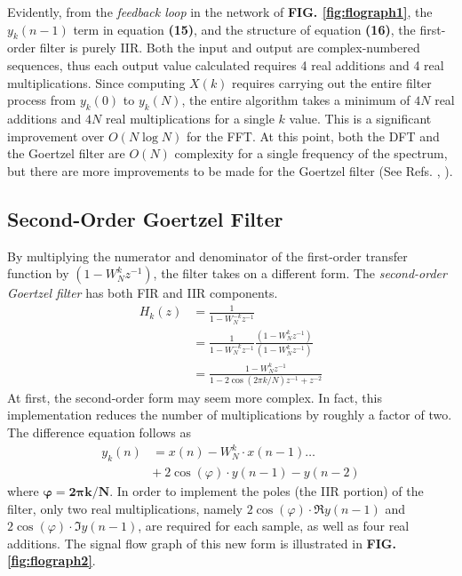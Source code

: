 \documentclass[reprint,amsmath,amssymb,aps,pra]{revtex4-2}
\begin{document}
Evidently, from the \textit{feedback loop} in the network of \textbf{FIG. \ref{fig:flograph1}}, the $y_k(n-1)$ term in equation \textbf{(15)}, and the structure of equation \textbf{(16)}, the first-order filter is purely IIR. Both the input and output are complex-numbered sequences, thus each output value calculated requires 4 real additions and 4 real multiplications. Since computing $X(k)$ requires carrying out the entire filter process from $y_k(0)$ to $y_k(N)$, the entire algorithm takes a minimum of $4N$ real additions and $4N$ real multiplications for a single $k$ value. This is a significant improvement over $O(N\log{N})$ for the FFT. At this point, both the DFT and the Goertzel filter are $O(N)$ complexity for a single frequency of the spectrum, but there are more improvements to be made for the Goertzel filter (See Refs. \cite{CooleyTukey1965}, \cite{DSPCSP}).

\subsection{Second-Order Goertzel Filter}

By multiplying the numerator and denominator of the first-order transfer function by $(1-W_N^kz^{-1})$, the filter takes on a different form. The \textit{second-order Goertzel filter} has both FIR and IIR components.
\begin{align}
    H_k(z) & = \frac{1}{1-W_N^{-k}z^{-1}} \nonumber \\
           & = \frac{1}{1-W_N^{-k}z^{-1}} \frac{(1-W_N^kz^{-1})}{(1-W_N^kz^{-1})} \nonumber \\
           & = \frac{1-W_N^kz^{-1}}{1-2\cos(2\pi k/N)z^{-1} + z^{-2}}
\end{align}
At first, the second-order form may seem more complex. In fact, this implementation reduces the number of multiplications by roughly a factor of two. The difference equation follows as
\begin{align}
    y_k(n) & = x(n) - W_N^k\cdot x(n-1) \ldots \nonumber \\ & +\ 2\cos(\varphi)\cdot y(n-1) - y(n-2)
\end{align}
where $\bm{\varphi = 2\pi k/N}$. In order to implement the poles (the IIR portion) of the filter, only two real multiplications, namely $2\cos(\varphi)\cdot \Re{y(n-1)}$ and $2\cos(\varphi)\cdot \Im{y(n-1)}$, are required for each sample, as well as four real additions. The signal flow graph of this new form is illustrated in \textbf{FIG. \ref{fig:flograph2}}.
\end{document}
